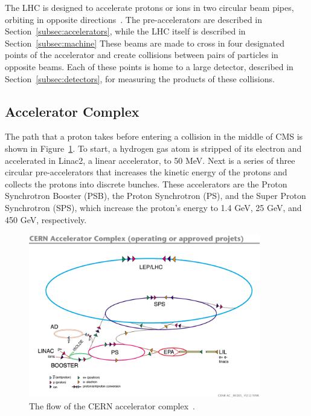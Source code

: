 The LHC is designed to accelerate protons or ions in two circular beam pipes, orbiting in opposite directions~\cite{cern-accelerators}. The pre-accelerators are described in Section~\ref{subsec:accelerators}, while the LHC
itself is described in Section~\ref{subsec:machine}
These beams are made to cross in four designated points of the accelerator and create collisions between
pairs of particles in opposite beams.
Each of these points is home to a large detector, described in Section~\ref{subsec:detectors},
for measuring the products of these collisions.

\subsection{Accelerator Complex\label{subsec:accelerators}}

The path that a proton takes before entering a collision in the middle of CMS is shown in
Figure~\ref{fig:cern_accelerators}. To start, a hydrogen gas atom is
stripped of its electron and accelerated in
Linac2, a linear accelerator, to 50 MeV. Next is a series of three circular pre-accelerators that
increases the kinetic energy of the protons and collects the protons into discrete bunches.
These accelerators are the Proton Synchrotron Booster (PSB), the Proton Synchrotron (PS), and the
Super Proton Synchrotron (SPS), which increase the proton's energy to 1.4 GeV, 25 GeV, and 450 GeV,
respectively. 

\begin{figure}[ht]
 \begin{center}
    \includegraphics[width=0.90\textwidth]{figures/experiment/lhc-pho-1991-001.jpg}
      \end{center}
\caption{The flow of the CERN accelerator complex~\cite{Jean-Luc:841493}.}
\label{fig:cern_accelerators}
\end{figure}

